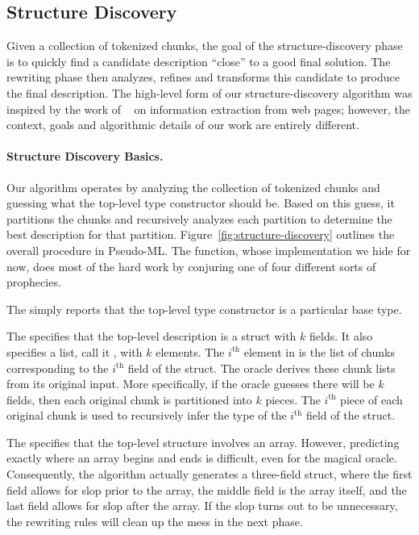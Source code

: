 \subsection {Structure Discovery}

Given a collection of tokenized chunks, the goal of the
structure-discovery phase is to quickly find a candidate description
``close'' to 
a good final solution.  The rewriting phase then analyzes, refines and
transforms this candidate to produce the final description.
The high-level form of our structure-discovery algorithm was
inspired by the work of ~\citet{arasu+:sigmod03} on information extraction from web pages;
however, the context, goals and algorithmic details of our
work are entirely different.


\paragraph*{Structure Discovery Basics.}
Our algorithm operates by analyzing the collection of tokenized chunks
and guessing what the top-level type constructor should be.  Based on
this guess, it partitions the chunks and recursively analyzes each partition
to determine the best description for that partition.
Figure~\ref{fig:structure-discovery} outlines the
overall procedure in Pseudo-ML.  The  function,
whose implementation we hide for now, does most of the hard work by
conjuring one of four different sorts of prophecies.  

The  simply reports that the top-level type
constructor is a particular base type.

The  specifies that the top-level description is a
struct with $k$ fields.  It also
specifies a list, call it , with $k$ elements.  The
$i^{\mathrm{th}}$ element in  is the list of chunks
corresponding to the $i^{\mathrm{th}}$ field of the struct.  The
oracle derives these chunk lists from its original input. More
specifically, if the oracle guesses there will be $k$ fields, then
each original chunk is partitioned into $k$ pieces. The
$i^{\mathrm{th}}$ piece of each original chunk is used to recursively
infer the type of the $i^{\mathrm{th}}$ field of the struct.

The  specifies that the top-level structure involves
an array.  However, predicting exactly where an array begins and ends
is difficult, even for the magical oracle.  Consequently, the
algorithm actually generates a three-field struct, where the first
field allows for slop prior to the array, the middle field is the
array itself, and the last field allows for slop after the array.  If
the slop turns out to be unnecessary, the rewriting rules will clean
up the mess in the next phase.

